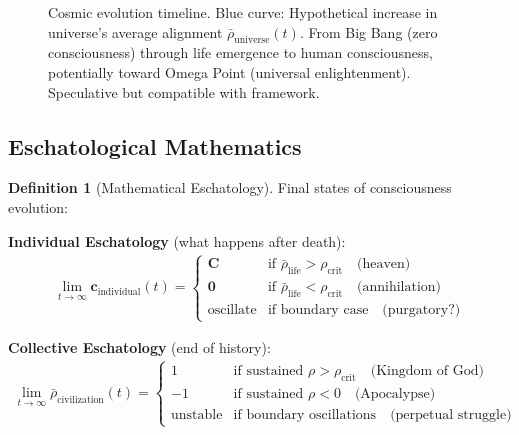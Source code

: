 \documentclass[11pt,a4paper]{article}
\theoremstyle{definition}
\newtheorem{definition}{Definition}[section]
\theoremstyle{remark}
\newcommand{\cc}{\mathbf{c}}
\begin{document}
\begin{enumerate}
\begin{figure}[H]
\caption{Cosmic evolution timeline. Blue curve: Hypothetical increase in universe's average alignment \(\bar{\rho}_{\text{universe}}(t)\). From Big Bang (zero consciousness) through life emergence to human consciousness, potentially toward Omega Point (universal enlightenment). Speculative but compatible with framework.}
\label{fig:cosmic_evolution}
\end{figure}

\subsection{Eschatological Mathematics}

\begin{definition}[Mathematical Eschatology]
Final states of consciousness evolution:

\textbf{Individual Eschatology} (what happens after death):
\begin{align}
\lim_{t \to \infty} \cc_{\text{individual}}(t) = \begin{cases}
\mathbf{C} & \text{if } \bar{\rho}_{\text{life}} > \rho_{\text{crit}} \quad \text{(heaven)} \\
\mathbf{0} & \text{if } \bar{\rho}_{\text{life}} < \rho_{\text{crit}} \quad \text{(annihilation)} \\
\text{oscillate} & \text{if boundary case} \quad \text{(purgatory?)}
\end{cases}
\end{align}

\textbf{Collective Eschatology} (end of history):
\begin{align}
\lim_{t \to \infty} \bar{\rho}_{\text{civilization}}(t) = \begin{cases}
1 & \text{if sustained } \rho > \rho_{\text{crit}} \quad \text{(Kingdom of God)} \\
-1 & \text{if sustained } \rho < 0 \quad \text{(Apocalypse)} \\
\text{unstable} & \text{if boundary oscillations} \quad \text{(perpetual struggle)}
\end{cases}
\end{align}


\end{definition}
\end{enumerate}
\end{document}
